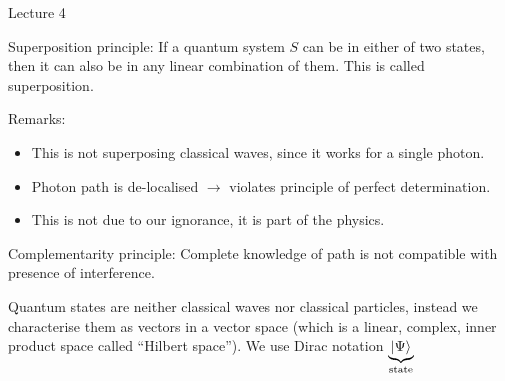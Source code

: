 \begin{center}

Lecture 4

\end{center}

Superposition principle: If a quantum system $S$ can be in either of two states, then it can also be in any linear combination of them. This is called superposition.

Remarks: 

\begin{itemize}
\item This is not superposing classical waves, since it works for a single photon.
\item Photon path is de-localised $\rightarrow$ violates principle of perfect determination.
\item This is not due to our ignorance, it is part of the physics.
\end{itemize}

Complementarity principle: Complete knowledge of path is not compatible with presence of interference.

\vspace{\baselineskip}

Quantum states are neither classical waves nor classical particles, instead we characterise them as vectors in a vector space (which is a linear, complex, inner product space called ``Hilbert space''). We use Dirac notation $\underbrace{\ket{\Psi}}_{\text{state}}$